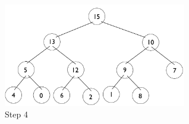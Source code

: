 \documentclass[11pt,letterpaper]{article}
\begin{document}
\begin{figure}[!ht]

	\begin{center}
	\includegraphics[width=80mm]{images/6_5_2_4_tree.png}
	\end{center}

\caption{Step 4 }
\end{figure}
\end{document}
